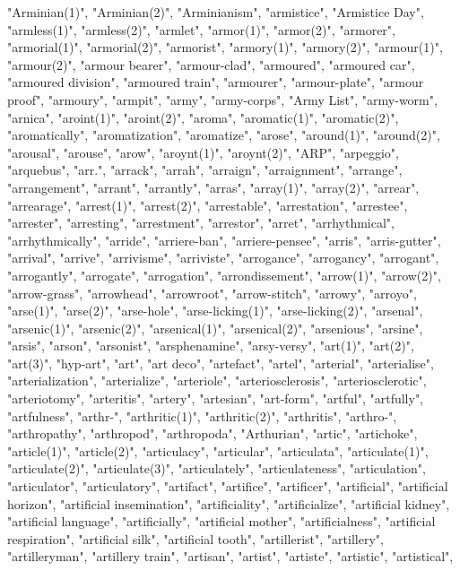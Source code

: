 "Arminian(1)",
"Arminian(2)",
"Arminianism",
"armistice",
"Armistice Day",
"armless(1)",
"armless(2)",
"armlet",
"armor(1)",
"armor(2)",
"armorer",
"armorial(1)",
"armorial(2)",
"armorist",
"armory(1)",
"armory(2)",
"armour(1)",
"armour(2)",
"armour bearer",
"armour-clad",
"armoured",
"armoured car",
"armoured division",
"armoured train",
"armourer",
"armour-plate",
"armour proof",
"armoury",
"armpit",
"army",
"army-corps",
"Army List",
"army-worm",
"arnica",
"aroint(1)",
"aroint(2)",
"aroma",
"aromatic(1)",
"aromatic(2)",
"aromatically",
"aromatization",
"aromatize",
"arose",
"around(1)",
"around(2)",
"arousal",
"arouse",
"arow",
"aroynt(1)",
"aroynt(2)",
"ARP",
"arpeggio",
"arquebus",
"arr.",
"arrack",
"arrah",
"arraign",
"arraignment",
"arrange",
"arrangement",
"arrant",
"arrantly",
"arras",
"array(1)",
"array(2)",
"arrear",
"arrearage",
"arrest(1)",
"arrest(2)",
"arrestable",
"arrestation",
"arrestee",
"arrester",
"arresting",
"arrestment",
"arrestor",
"arret",
"arrhythmical",
"arrhythmically",
"arride",
"arriere-ban",
"arriere-pensee",
"arris",
"arris-gutter",
"arrival",
"arrive",
"arrivisme",
"arriviste",
"arrogance",
"arrogancy",
"arrogant",
"arrogantly",
"arrogate",
"arrogation",
"arrondissement",
"arrow(1)",
"arrow(2)",
"arrow-grass",
"arrowhead",
"arrowroot",
"arrow-stitch",
"arrowy",
"arroyo",
"arse(1)",
"arse(2)",
"arse-hole",
"arse-licking(1)",
"arse-licking(2)",
"arsenal",
"arsenic(1)",
"arsenic(2)",
"arsenical(1)",
"arsenical(2)",
"arsenious",
"arsine",
"arsis",
"arson",
"arsonist",
"arsphenamine",
"arsy-versy",
"art(1)",
"art(2)",
"art(3)",
"hyp-art",
"art",
"art deco",
"artefact",
"artel",
"arterial",
"arterialise",
"arterialization",
"arterialize",
"arteriole",
"arteriosclerosis",
"arteriosclerotic",
"arteriotomy",
"arteritis",
"artery",
"artesian",
"art-form",
"artful",
"artfully",
"artfulness",
"arthr-",
"arthritic(1)",
"arthritic(2)",
"arthritis",
"arthro-",
"arthropathy",
"arthropod",
"arthropoda",
"Arthurian",
"artic",
"artichoke",
"article(1)",
"article(2)",
"articulacy",
"articular",
"articulata",
"articulate(1)",
"articulate(2)",
"articulate(3)",
"articulately",
"articulateness",
"articulation",
"articulator",
"articulatory",
"artifact",
"artifice",
"artificer",
"artificial",
"artificial horizon",
"artificial insemination",
"artificiality",
"artificialize",
"artificial kidney",
"artificial language",
"artificially",
"artificial mother",
"artificialness",
"artificial respiration",
"artificial silk",
"artificial tooth",
"artillerist",
"artillery",
"artilleryman",
"artillery train",
"artisan",
"artist",
"artiste",
"artistic",
"artistical",
